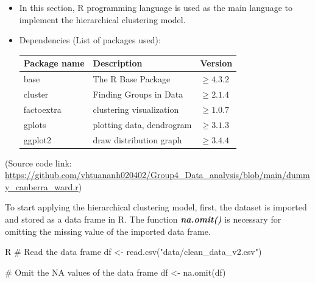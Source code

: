     \begin{itemize}
        \item In this section, R programming language is used as the main language to implement the hierarchical clustering model.

         \item Dependencies (List of packages used):

                 \begingroup
                    \setlength{\tabcolsep}{10pt} %
                    \renewcommand{\arraystretch}{1.2} %
                    \begin{tabular}{ | l | l |  l |} %
                      \hline
                    \textbf{Package name} & \textbf{Description} & \textbf{Version} \\
                      \hline 
                    base & The R Base Package & $\ge 4.3.2$\\
                      \hline
                    cluster & Finding Groups in Data &  $\ge 2.1.4 $ \\
                      \hline
                    factoextra & clustering visualization &  $\ge 1.0.7 $ \\
                      \hline
                    gplots & plotting data, dendrogram &  $\ge 3.1.3 $ \\
                      \hline
                    ggplot2 & draw distribution graph &  $\ge 3.4.4 $ \\
                      \hline
                      
                    \end{tabular}
                \endgroup
         
    \end{itemize}

   
    \vspace{2mm}
    
    (Source code link: \url{https://github.com/vhtuananh020402/Group4_Data_analysis/blob/main/dummy_canberra_ward.r})
    
    \vspace{2mm}

    To start applying the hierarchical clustering model, first, the dataset is imported and stored as a data frame in R. The function \textbf{\textit{na.omit()}} is necessary for omitting the missing value of the imported data frame. 
    \begin{code}{R}
        # Read the data frame
        df <- read.csv("data/clean_data_v2.csv")
        
        # Omit the NA values of the data frame
        df <- na.omit(df)
    \end{code}

